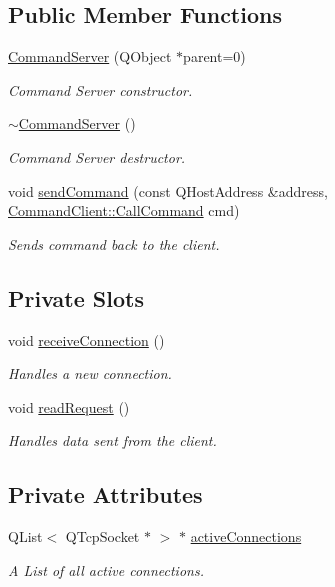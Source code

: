 \subsection*{\-Public \-Member \-Functions}
\begin{DoxyCompactItemize}
\item 
\hyperlink{class_command_server_ae341a512a49c2453c306f5e4d576c052}{\-Command\-Server} (\-Q\-Object $\ast$parent=0)
\begin{DoxyCompactList}\small\item\em \-Command \-Server constructor. \end{DoxyCompactList}\item 
\hyperlink{class_command_server_a89f1d55bb111f7954d022e0c63d3b87f}{$\sim$\-Command\-Server} ()
\begin{DoxyCompactList}\small\item\em \-Command \-Server destructor. \end{DoxyCompactList}\item 
void \hyperlink{class_command_server_a1fc3321611893adbaecc4bdeca585570}{send\-Command} (const \-Q\-Host\-Address \&address, \hyperlink{class_command_client_aa99b17193724fef8aed2b2c724b0c243}{\-Command\-Client\-::\-Call\-Command} cmd)
\begin{DoxyCompactList}\small\item\em \-Sends command back to the client. \end{DoxyCompactList}\end{DoxyCompactItemize}
\subsection*{\-Private \-Slots}
\begin{DoxyCompactItemize}
\item 
void \hyperlink{class_command_server_af53895bade586760690c98507afcac2d}{receive\-Connection} ()
\begin{DoxyCompactList}\small\item\em \-Handles a new connection. \end{DoxyCompactList}\item 
void \hyperlink{class_command_server_ac0484c440ded5599dc38e61d517095d5}{read\-Request} ()
\begin{DoxyCompactList}\small\item\em \-Handles data sent from the client. \end{DoxyCompactList}\end{DoxyCompactItemize}
\subsection*{\-Private \-Attributes}
\begin{DoxyCompactItemize}
\item 
\-Q\-List$<$ \-Q\-Tcp\-Socket $\ast$ $>$ $\ast$ \hyperlink{class_command_server_ac962c19774ad5f9df8233280028252d3}{active\-Connections}
\begin{DoxyCompactList}\small\item\em \-A \-List of all active connections. \end{DoxyCompactList}\end{DoxyCompactItemize}


